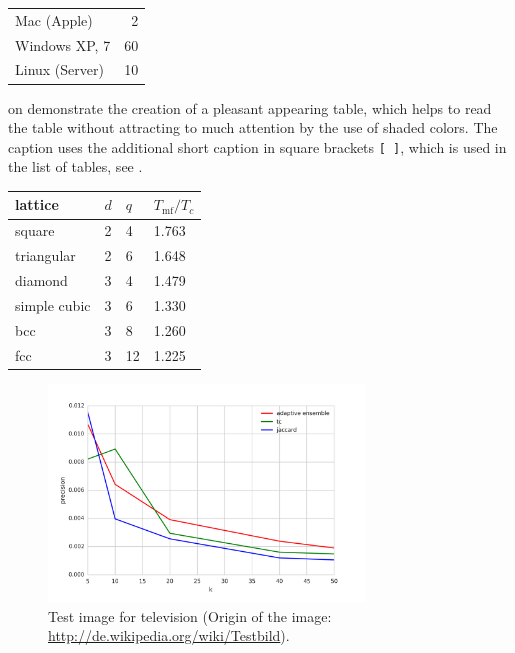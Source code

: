 \begin{table}[hb]
\centering
\small\renewcommand{\arraystretch}{1.4}  
\label{tab:Computers}
\begin{tabular}{lr}
\hline
Mac (Apple)    & 2  \\
Windows XP, 7  & 60 \\
Linux (Server) & 10 \\
\hline
\end{tabular}
\end{table}

 on  demonstrate the creation of a pleasant appearing table, which helps to read the table without attracting to much attention by the use of shaded colors. The caption uses the additional short caption in square brackets \texttt{[ ]}, which is used in the list of tables, see .

\begin{table}[ht]
\centering
\small\renewcommand{\arraystretch}{1.4}  
%
\label{tab:IsingModel}
%
\begin{tabularx}{0.5\textwidth}{lXXX}
\hline
\rowcolor{tableheadcolor}
lattice & $d$ & $q$ & $T_\text{mf}/T_c$ \\
\hline
square  & 2 & 4 & 1.763 \\
%
triangular & 2 & 6 & 1.648 \\
%
diamond & 3 & 4 & 1.479 \\
%
simple cubic & 3 & 6 & 1.330 \\
%
bcc & 3 & 8 & 1.260 \\
%
fcc & 3 & 12 & 1.225 \\
\hline
\end{tabularx}
\end{table}


\begin{figure}[htb]
  \centering
  \includegraphics[width=0.75\textwidth]{images/precision_line.png}
  \caption[Test image for television]{Test image for television (Origin of the image: \url{http://de.wikipedia.org/wiki/Testbild}).}
  \label{fig:example:figure}
\end{figure}

